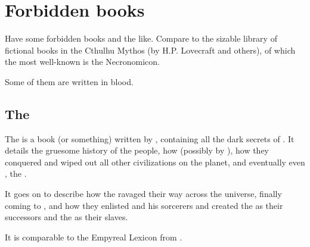 \section{Forbidden books}
Have some forbidden books and the like. Compare to the sizable library of fictional books in the Cthulhu Mythos (by H.P. Lovecraft and others), of which the most well-known is the Necronomicon. 

Some of them are written in blood.









\subsection[The Bath Shem Torradj]{The \BathShemTorradjErebossha}
The \BathShemTorradjErebossha{} is 
a book (or something) written by , containing all the dark secrets of . It details the gruesome history of the  people, how  (possibly by ), how they conquered \Erebos{} and wiped out all other civilizations on the planet, and eventually even , the \voyagers.

It goes on to describe how the \banes{} ravaged their way across the universe, finally coming to \Miith{}, and how they enlisted \Semiza{} and his sorcerers and created the \resphain{} as their successors and the \humans{} as their slaves. 

It is comparable to the Empyreal Lexicon from .


